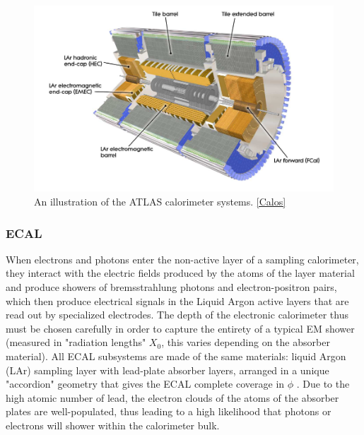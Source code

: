 \begin{figure}
  \includegraphics[width=\linewidth]{figures/detector_chapter/Calos.png}
  \caption{An illustration of the ATLAS calorimeter systems. \ref{Calos}}
  \label{fig:Calos}
\end{figure}


\subsubsection{ECAL} \label{sec:ECAL} 

When electrons and photons enter the non-active layer of a sampling calorimeter, they interact with the electric fields produced by the atoms of the layer material and produce showers of bremsstrahlung photons and electron-positron pairs, which then produce electrical signals in the Liquid Argon active layers that are read out by specialized electrodes. The depth of the electronic calorimeter thus must be chosen carefully in order to capture the entirety of a typical EM shower (measured in "radiation lengths" $X_0$, this varies depending on the absorber material). All ECAL subsystems are made of the same materials: liquid Argon (LAr) sampling layer with lead-plate absorber layers, arranged in a unique "accordion" geometry that gives the ECAL complete coverage in $\phi$ . Due to the high atomic number of lead, the electron clouds of the atoms of the absorber plates are well-populated, thus leading to a high likelihood that photons or electrons will shower within the calorimeter bulk.

